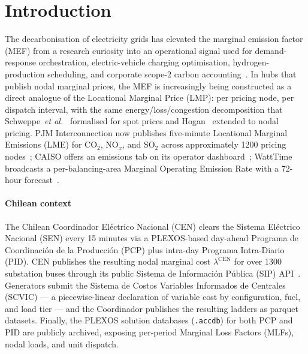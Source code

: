 \section{Introduction}
\label{sec:introduction}

The decarbonisation of electricity grids has elevated the marginal
emission factor (MEF) from a research curiosity into an operational
signal used for demand-response orchestration, electric-vehicle
charging optimisation, hydrogen-production scheduling, and corporate
scope-2 carbon accounting~\cite{Hawkes2010,SilerEvans2012,
Callaway2018}.  In hubs that publish nodal marginal prices, the MEF
is increasingly being constructed as a direct analogue of the
Locational Marginal Price (LMP): per pricing node, per dispatch
interval, with the same energy/loss/congestion decomposition that
Schweppe~\textit{et al.}~\cite{Schweppe1988} formalised for spot
prices and Hogan~\cite{Hogan1992} extended to nodal pricing.  PJM
Interconnection now publishes five-minute Locational Marginal
Emissions (LME) for CO$_2$, NO$_x$, and SO$_2$ across approximately
\num{1200} pricing nodes~\cite{PJMLME2024}; CAISO offers an
emissions tab on its operator dashboard~\cite{CAISOOutlook};
WattTime broadcasts a per-balancing-area Marginal Operating Emission
Rate with a 72-hour forecast~\cite{WattTime2024}.

\paragraph{Chilean context}
The Chilean Coordinador El\'ectrico Nacional (CEN) clears the
Sistema El\'ectrico Nacional (SEN) every 15 minutes via a PLEXOS-based
day-ahead Programa de Coordinaci\'on de la Producci\'on (PCP) plus
intra-day Programa Intra-Diario (PID).  CEN publishes the resulting
nodal marginal cost $\lambda^{\mathrm{CEN}}$ for over \num{1300}
substation buses through its public Sistema de Informaci\'on
P\'ublica (SIP) API~\cite{CENSIP2024}.  Generators submit the
Sistema de Costos Variables Informados de Centrales (SCVIC) — a
piecewise-linear declaration of variable cost by configuration,
fuel, and load tier — and the Coordinador publishes the resulting
ladders as parquet datasets.  Finally, the PLEXOS solution
databases (\texttt{.accdb}) for both PCP and PID are publicly
archived, exposing per-period Marginal Loss Factors (MLFs), nodal
loads, and unit dispatch.

